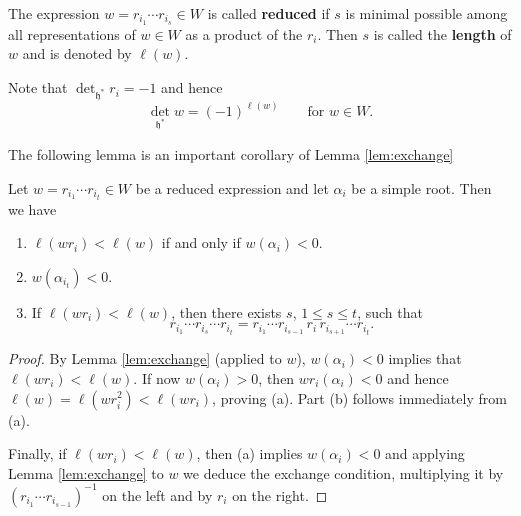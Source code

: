 \documentclass[12pt]{article}
\begin{document}
\begin{definition}
    The expression $w = r_{i_1}\cdots r_{i_s} \in W$ is called \textbf{reduced} if $s$ is
    minimal possible among all representations of $w \in W$ as a product of the $r_i$.
    Then $s$ is called the \textbf{length} of $w$ and is denoted by $\ell(w)$.
\end{definition}
Note that $\det_{\mathfrak{h}^*} r_i = -1$ and hence
\begin{equation}\label{eq:3.11.1}
    \det_{\mathfrak{h}^*} w = (-1)^{\ell(w)} \qquad \text{for } w \in W.
\end{equation}

The following lemma is an important corollary of Lemma \ref{lem:exchange}

\begin{lemma}
    Let $w = r_{i_1}\cdots r_{i_t} \in W$ be a reduced expression and let $\alpha_i$
    be a simple root. Then we have
    \begin{enumerate}[label=(\alph*)]
        \item $\ell(wr_i) < \ell(w)$ if and only if $w(\alpha_i) < 0$.
        \item $w(\alpha_{i_t}) < 0$.
        \item If $\ell(wr_i) < \ell(w)$, then there exists $s$,
              $1 \leq s \leq t$, such that
              \[
                  r_{i_1}\cdots r_{i_s}\cdots r_{i_t} = r_{i_1}\cdots r_{i_{s-1}}\, r_i\, r_{i_{s+1}}\cdots r_{i_t}.
              \]
    \end{enumerate}
\end{lemma}

\begin{proof}
    By Lemma \ref{lem:exchange} (applied to $w$), $w(\alpha_i)<0$ implies that $\ell(wr_i)<\ell(w)$.
    If now $w(\alpha_i) > 0$, then $wr_i(\alpha_i)<0$ and hence $\ell(w) = \ell(wr_i^2) < \ell(wr_i)$, proving (a).
    Part (b) follows immediately from (a).

    Finally, if $\ell(wr_i)<\ell(w)$, then (a) implies $w(\alpha_i)<0$ and applying
    Lemma \ref{lem:exchange} to $w$ we deduce the exchange condition, multiplying it
    by $(r_{i_1}\cdots r_{i_{s-1}})^{-1}$ on the left and by $r_i$ on the right.
\end{proof}
\end{document}
